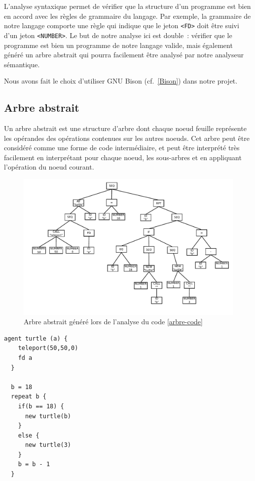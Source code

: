 L'analyse syntaxique permet de vérifier que la structure d'un programme est bien en accord avec les règles de grammaire du langage. Par exemple, la grammaire de notre langage comporte une règle qui indique que le jeton \verb|<FD>| doit être suivi d'un jeton \verb|<NUMBER>|. Le but de notre analyse ici est double~: vérifier que le programme est bien un programme de notre langage valide, mais également généré un arbre abstrait qui pourra facilement être analysé par notre analyseur sémantique.

Nous avons fait le choix d'utiliser GNU Bison (cf.~\ref{Bison}) dans notre projet.

\subsection{Arbre abstrait}
Un arbre abstrait est une structure d'arbre dont chaque noeud feuille représente les opérandes des opérations contenues sur les autres noeuds. Cet arbre peut être considéré comme une forme de code intermédiaire, et peut être interprété très facilement en interprétant pour chaque noeud, les sous-arbres et en appliquant l'opération du noeud courant.

\begin{figure}[h!]
\centering
\includegraphics[scale=0.8]{doc/report/img/arbre-abstrait}
\caption{\label{arbre-abstrait} Arbre abstrait généré lors de l'analyse du code \ref{arbre-code}}
\end{figure}
\begin{lstlisting}[language=Stibbons,label=arbre-code,caption=Exemple de code Stibbons]
  agent turtle (a) {
    teleport(50,50,0)
    fd a
  }

  b = 18
  repeat b {
    if(b == 18) {
      new turtle(b)
    }
    else {
      new turtle(3)
    }
    b = b - 1
  }
\end{lstlisting}

